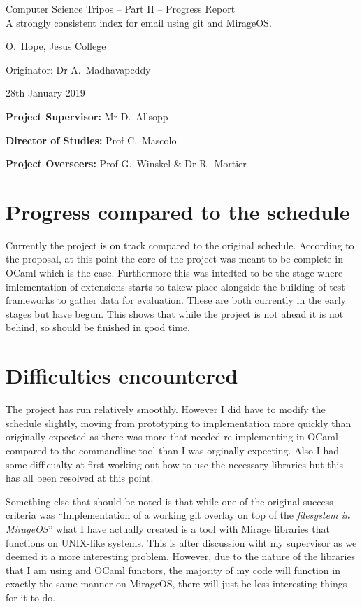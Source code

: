 \documentclass[12pt,a4paper,twoside]{article}
\begin{document}
\begin{center}
    \Large
    Computer Science Tripos -- Part II -- Progress Report\\[4mm]
    \LARGE
    A strongly consistent index for email using git and MirageOS.

    \large
    O.~Hope, Jesus College

    Originator: Dr A.~Madhavapeddy

    28th January 2019
\end{center}

\vspace{5mm}

\textbf{Project Supervisor:} Mr D.~Allsopp

\textbf{Director of Studies:} Prof C.~Mascolo

\textbf{Project Overseers:} Prof G.~Winskel \& Dr R.~Mortier


\section*{Progress compared to the schedule}

Currently the project is on track compared to the original schedule. According to the proposal, at this point the core of the project was meant to be complete in OCaml which is the case. Furthermore this was intedted to be the stage where imlementation of extensions starts to takew place alongside the building of test frameworks to gather data for evaluation. These are both currently in the early stages but have begun. This shows that while the project is not ahead it is not behind, so should be finished in good time.

\section*{Difficulties encountered}

The project has run relatively smoothly. However I did have to modify the schedule slightly, moving from prototyping to implementation more quickly than originally expected as there was more that needed re-implementing in OCaml compared to the commandline tool than I was orginally expecting. Also I had some difficualty at first working out how to use the necessary libraries but this has all been resolved at this point.

Something else that should be noted is that while one of the original success criteria was ``Implementation of a working git overlay on top of the \emph{filesystem in MirageOS}'' what I have actually created is a tool with Mirage libraries that functions on UNIX-like systems. This is after discussion wiht my supervisor as we deemed it a more interesting problem. However, due to the nature of the libraries that I am using and OCaml functors, the majority of my code will function in exactly the same manner on MirageOS, there will just be less interesting things for it to do.
\end{document}
